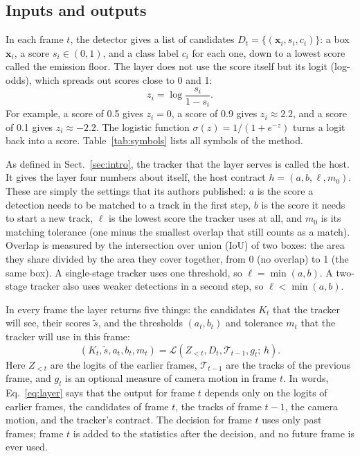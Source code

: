 \subsection{Inputs and outputs}\label{sec:problem}
In each frame $t$, the detector gives a list of candidates
$D_t=\{(\mathbf{x}_i,s_i,c_i)\}$: a box $\mathbf{x}_i$, a score
$s_i\in(0,1)$, and a class label $c_i$ for each one, down to a lowest score
called the emission floor. The layer does not use the score itself but its
logit (log-odds), which spreads out scores close to 0 and 1:
\begin{equation}
z_i=\log\frac{s_i}{1-s_i}.
\label{eq:logit}
\end{equation}
For example, a score of 0.5 gives $z_i=0$, a score of 0.9 gives
$z_i\approx2.2$, and a score of 0.1 gives $z_i\approx-2.2$. The logistic
function $\sigma(z)=1/(1+e^{-z})$ turns a logit back into a score. Table~\ref{tab:symbols}
lists all symbols of the method.

As defined in Sect.~\ref{sec:intro}, the tracker that the layer serves is
called the host. It gives the layer four numbers about itself, the host
contract $h=(a,b,\ell,m_0)$. These are simply the settings that its
authors published: $a$ is the score a detection needs to be matched to a
track in the first step, $b$ is the score it needs to start a new track,
$\ell$ is the lowest score the tracker uses at all, and $m_0$ is its matching
tolerance (one minus the smallest overlap that still counts as a match).
Overlap is measured by the intersection over union (IoU) of two boxes: the
area they share divided by the area they cover together, from 0 (no overlap)
to 1 (the same box). A
single-stage tracker uses one threshold, so $\ell=\min(a,b)$. A two-stage
tracker also uses weaker detections in a second step, so
$\ell<\min(a,b)$.

In every frame the layer returns five things: the candidates $K_t$ that the
tracker will see, their scores $\tilde{s}$, and the thresholds $(a_t,b_t)$
and tolerance $m_t$ that the tracker will use in this frame:
\begin{equation}
\left(K_t,\tilde{s},a_t,b_t,m_t\right)=
\mathcal{L}\left(Z_{<t},D_t,\mathcal{T}_{t-1},g_t;\,h\right).
\label{eq:layer}
\end{equation}
Here $Z_{<t}$ are the logits of the earlier frames, $\mathcal{T}_{t-1}$ are
the tracks of the previous frame, and $g_t$ is an optional measure of camera
motion in frame $t$. In words, Eq.~\eqref{eq:layer} says that the output for
frame $t$ depends only on the logits of earlier frames, the candidates of
frame $t$, the tracks of frame $t-1$, the camera motion, and the tracker's
contract. The decision for frame $t$ uses only past frames; frame $t$ is
added to the statistics after the decision, and no future frame is ever
used.

